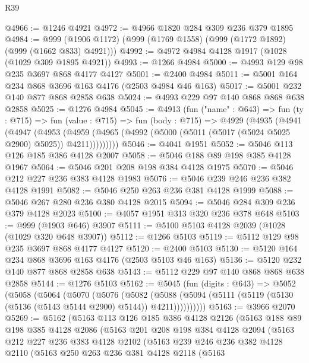 \begin{lexlean}{R39}
\begin{coremodule}
@4966 := @1246 @4921
@4972 := @4966 @1820 @284 @309 @236 @379 @1895
@4984 := @999 (@1906 @1172) (@999 (@1769 @1558) (@999 (@1772 @1892) (@999 (@1662 @833) @4921)))
@4992 := @4972 @4984 @4128 @1917 (@1028 (@1029 @309 @1895 @4921))
@4993 := @1266 @4984
@5000 := @4993 @129 @98 @235 @3697 @868 @4177 @4127
@5001 := @2400 @4984
@5011 := @5001 @164 @234 @868 @3696 @163 @4176 (@2503 @4984 @46 @163)
@5017 := @5001 @232 @140 @877 @868 @2858 @638
@5024 := @4993 @229 @97 @140 @868 @868 @638 @2858
@5025 := @1276 @4984
@5045 := @4913
    (fun ("name" : @643) =>
    fun (ty : @715) =>
    fun (value : @715) =>
    fun (body : @715) =>
    @4929
      (@4935
        (@4941
          (@4947
            (@4953
              (@4959 (@4965 (@4992 (@5000 (@5011 (@5017 (@5024 @5025 @2900) @5025)) @4211)))))))))
@5046 := @4041 @1951
@5052 := @5046 @113 @126 @185 @386 @4128 @2007
@5058 := @5046 @188 @89 @198 @385 @4128 @1967
@5064 := @5046 @201 @208 @198 @384 @4128 @1975
@5070 := @5046 @212 @227 @236 @383 @4128 @1983
@5076 := @5046 @239 @246 @236 @382 @4128 @1991
@5082 := @5046 @250 @263 @236 @381 @4128 @1999
@5088 := @5046 @267 @280 @236 @380 @4128 @2015
@5094 := @5046 @284 @309 @236 @379 @4128 @2023
@5100 := @4057 @1951 @313 @320 @236 @378 @648
@5103 := @999 (@1903 @646) @3907
@5111 := @5100 @5103 @4128 @2039 (@1028 (@1029 @320 @648 @3907))
@5112 := @1266 @5103
@5119 := @5112 @129 @98 @235 @3697 @868 @4177 @4127
@5120 := @2400 @5103
@5130 := @5120 @164 @234 @868 @3696 @163 @4176 (@2503 @5103 @46 @163)
@5136 := @5120 @232 @140 @877 @868 @2858 @638
@5143 := @5112 @229 @97 @140 @868 @868 @638 @2858
@5144 := @1276 @5103
@5162 := @5045
    (fun (digits : @643) =>
    @5052
      (@5058
        (@5064
          (@5070
            (@5076
              (@5082
                (@5088
                  (@5094 (@5111 (@5119 (@5130 (@5136 (@5143 @5144 @2900) @5144)) @4211))))))))))
@5163 := @3966 @2070
@5269 := @5162
    (@5163
      @113
      @126
      @185
      @386
      @4128
      @2126
      (@5163
        @188
        @89
        @198
        @385
        @4128
        @2086
        (@5163
          @201
          @208
          @198
          @384
          @4128
          @2094
          (@5163
            @212
            @227
            @236
            @383
            @4128
            @2102
            (@5163
              @239
              @246
              @236
              @382
              @4128
              @2110
              (@5163
                @250
                @263
                @236
                @381
                @4128
                @2118
                (@5163

\end{coremodule}
\end{lexlean}
